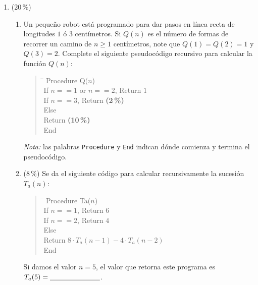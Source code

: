 \documentclass[11pt]{article}
\newcommand{\resp}{\underline{\hspace{2.5cm}}}
\newenvironment{pseudo}{%
  \begin{quote}\ttfamily\small\begin{tabbing}
  \hspace{2em}\=\hspace{2em}\=\hspace{2em}\=\hspace{2em}\=\kill}{%
  \end{tabbing}\end{quote}}
\begin{document}
\begin{enumerate}
\item (20\,\%)
\begin{enumerate}
\item Un pequeño robot está programado para dar pasos en línea recta de longitudes $1$ ó $3$ centímetros. Si $Q(n)$ es el número de formas de recorrer un camino de $n \geq 1$ centímetros, note que $Q(1) = Q(2) = 1$ y $Q(3) = 2$. Complete el siguiente pseudocódigo recursivo para calcular la función $Q(n)$:
\begin{pseudo}
Procedure Q($n$)\\
\>If $n == 1$ or $n == 2$, Return $1$\\
\>If $n == 3$, Return \underline{\hspace{2cm}} \quad\textbf{(2\,\%)}\\
\>Else\\
\>\>Return \underline{\hspace{4cm}} \quad\textbf{(10\,\%)}\\
End
\end{pseudo}
\emph{Nota:} las palabras \texttt{Procedure} y \texttt{End} indican dónde comienza y termina el pseudocódigo.
\item (8\,\%) Se da el siguiente código para calcular recursivamente la sucesión $T_a(n)$:
\begin{pseudo}
Procedure Ta($n$)\\
\>If $n == 1$, Return $6$\\
\>If $n == 2$, Return $4$\\
\>Else\\
\>\>Return $8 \cdot T_a(n-1) - 4 \cdot T_a(n-2)$\\
End
\end{pseudo}
Si damos el valor $n = 5$, el valor que retorna este programa es $T_a(5) = \resp$.
\end{enumerate}


\end{enumerate}
\end{document}
